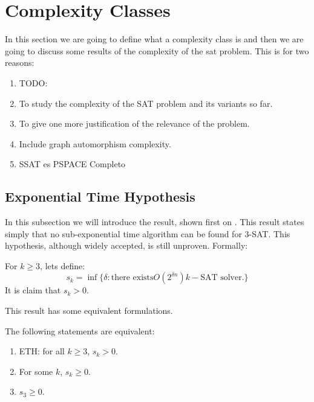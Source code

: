\section{Complexity Classes}
\label{sec:complexity}
In this section we are going to define what a complexity class is and then we are going to discuss some results of the complexity of the sat problem. This is for two reasons: 




\begin{enumerate}
  \item TODO:
\item To study the complexity of the SAT problem and its variants so far.
\item To give one more justification of the relevance of the problem.
\item Include graph automorphism complexity.
  \item SSAT es PSPACE Completo
\end{enumerate}

\subsection{Exponential Time Hypothesis}
\label{hyp:exponential_time}
In this subsection we will introduce the result, shown first on \cite{impagliazzo2001complexity}. This result states simply that no sub-exponential time algorithm can be found for 3-SAT. This hypothesis, although widely accepted, is still unproven. Formally:

\begin{definition}[ETH]
  For $k\ge 3$, lets define:
  $$s_k=\inf\{\delta: \text{there exists} O(2^{\delta n}) k-\text{SAT solver.}\}$$
  It is claim that $s_k>0$.
\end{definition}

This result has some equivalent formulations.

\begin{proposition}
  The following statements are equivalent:
  \begin{enumerate}
  \item ETH: for all $k\ge 3$, $s_k > 0$.
  \item For some $k$, $s_k \ge 0$.
  \item $s_3 \ge 0$.

  \end{enumerate}
  \end{proposition}

